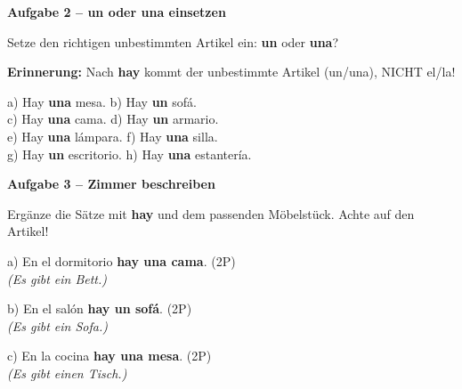 \documentclass[11pt, a4paper]{article}
\newcommand{\fachfarbe}{spanisch}
\newcommand{\punktebox}[1]{\hfill\fbox{\small \_/#1}}
\newcommand{\lsg}[1]{\textcolor{loesung}{\textbf{#1}}}
\newenvironment{aufgabe}[1]{%
    \needspace{5\baselineskip}%
    \nopagebreak[4]%
    \vspace{10pt}
    \noindent\textbf{\textcolor{\fachfarbe}{Aufgabe #1}}
    \nopagebreak[4]%
    \vspace{5pt}
    \nopagebreak[4]%
    \begin{list}{}{\leftmargin=0pt}
    \item[]
}{%
    \end{list}
}
\newcommand{\es}[1]{\textcolor{\fachfarbe}{\textbf{#1}}}
\begin{document}
\vspace{15pt}


\begin{aufgabe}{2 -- un oder una einsetzen}
Setze den richtigen unbestimmten Artikel ein: \es{un} oder \es{una}? \punktebox{8}
\end{aufgabe}

\begin{warnbox}
\textbf{Erinnerung:} Nach \es{hay} kommt der unbestimmte Artikel (un/una), NICHT el/la!
\end{warnbox}

\vspace{0.5em}

\noindent
a) Hay \lsg{una} mesa. \hfill
b) Hay \lsg{un} sofá. \\[0.8em]
c) Hay \lsg{una} cama. \hfill
d) Hay \lsg{un} armario. \\[0.8em]
e) Hay \lsg{una} lámpara. \hfill
f) Hay \lsg{una} silla. \\[0.8em]
g) Hay \lsg{un} escritorio. \hfill
h) Hay \lsg{una} estantería. \\

\vspace{15pt}


\begin{aufgabe}{3 -- Zimmer beschreiben}
Ergänze die Sätze mit \es{hay} und dem passenden Möbelstück. Achte auf den Artikel! \punktebox{12}
\end{aufgabe}

\noindent
a) En el dormitorio \lsg{hay una cama}. \hfill (2P) \\
\hspace*{0.5cm}\textit{(Es gibt ein Bett.)}

\vspace{0.8em}

\noindent
b) En el salón \lsg{hay un sofá}. \hfill (2P) \\
\hspace*{0.5cm}\textit{(Es gibt ein Sofa.)}

\vspace{0.8em}

\noindent
c) En la cocina \lsg{hay una mesa}. \hfill (2P) \\
\hspace*{0.5cm}\textit{(Es gibt einen Tisch.)}
\end{document}
